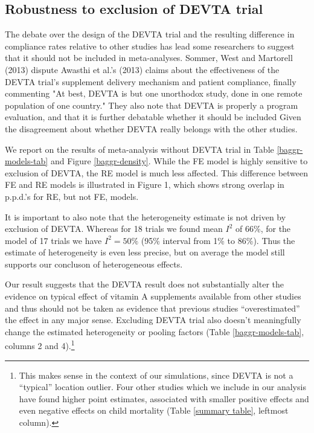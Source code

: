 \documentclass[12pt]{article}
\begin{document}
\subsection{Robustness to exclusion of DEVTA trial}

The debate over the design of the DEVTA trial and the resulting difference in compliance rates relative to other studies has lead some researchers to suggest that it should not be included in meta-analyses. Sommer, West and Martorell (2013) dispute Awasthi et al.'s (2013) claims about the effectiveness of the DEVTA trial's supplement delivery mechanism and patient compliance, finally commenting "At best, DEVTA is but one unorthodox study, done in one remote population of one country." 
They also note that DEVTA is properly a program evaluation, and that it is further debatable whether it should be included Given the disagreement about whether DEVTA really belongs with the other studies. 

We report on the results of meta-analysis without DEVTA trial in Table \ref{baggr-models-tab} and Figure \ref{baggr-density}. While the FE model is highly sensitive to exclusion of DEVTA, the RE model is much less affected. This difference between FE and RE models is illustrated in Figure 1, which shows strong overlap in p.p.d.'s for RE, but not FE, models.

It is important to also note that the heterogeneity estimate is not driven by exclusion of DEVTA. Whereas for 18 trials we found mean $I^2$ of 66\%, for the model of 17 trials we have $I^2 = 50\%$ (95\% interval from 1\% to 86\%). Thus the estimate of heterogeneity is even less precise, but on average the model still supports our concluson of heterogeneous effects.

Our result suggests that the DEVTA result does not substantially alter the evidence on typical effect of vitamin A supplements available from other studies and thus should not be taken as evidence that previous studies ``overestimated'' the effect in any major sense. Excluding DEVTA trial also doesn't meaningfully change the estimated heterogeneity or pooling factors (Table \ref{baggr-models-tab}, columns 2 and 4).\footnote{This makes sense in the context of our simulations, since DEVTA is not a ``typical'' location outlier. Four other studies which we include in our analysis have found higher point estimates, associated with smaller positive effects and even negative effects on child mortality (Table \ref{summary table}, leftmost column).}
\end{document}
